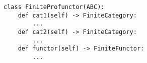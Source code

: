 \begin{verbatim}
class FiniteProfunctor(ABC):
    def cat1(self) -> FiniteCategory:
        ...
    def cat2(self) -> FiniteCategory:
        ...
    def functor(self) -> FiniteFunctor:
        ...
\end{verbatim}